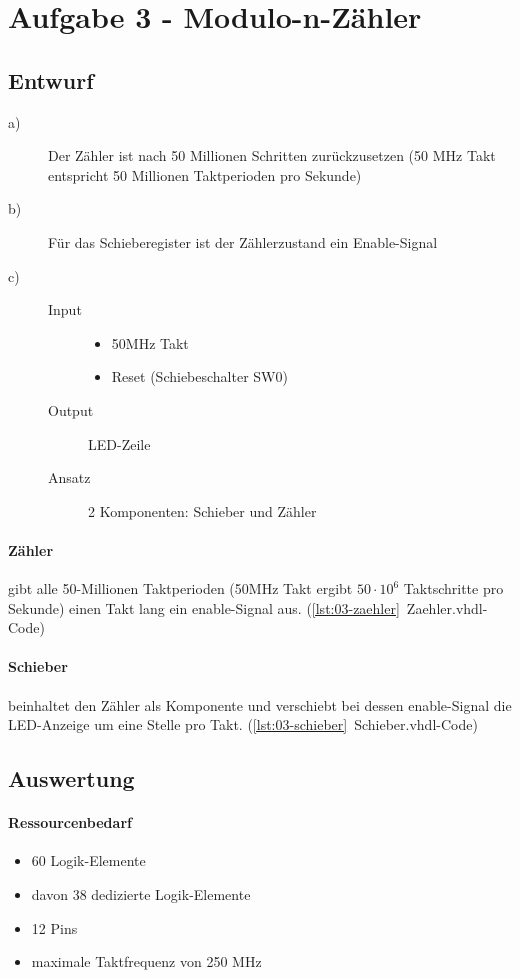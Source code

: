 \section{Aufgabe 3 - Modulo-n-Zähler}
\subsection{Entwurf}
\begin{description}
\item[a)] Der Zähler ist nach 50 Millionen Schritten zurückzusetzen (50 MHz Takt entspricht 50 Millionen Taktperioden pro Sekunde)
\item[b)] Für das Schieberegister ist der Zählerzustand ein Enable-Signal
\item[c)] \hfill 
	\begin{description}
	\item[Input] \hfill 
		\begin{itemize}
			\item 50MHz Takt
			\item Reset (Schiebeschalter SW0)
		\end{itemize}
	\item[Output] LED-Zeile
	\item[Ansatz] 2 Komponenten: Schieber und Zähler 
	\end{description}	
\end{description}
\paragraph{Zähler} gibt alle 50-Millionen Taktperioden (50MHz Takt ergibt $50\cdot10^6$ Taktschritte pro Sekunde) einen Takt lang ein enable-Signal aus. 
(\ref{lst:03-zaehler}~Zaehler.vhdl-Code)
\paragraph{Schieber} beinhaltet den Zähler als Komponente und verschiebt bei dessen enable-Signal die LED-Anzeige um eine Stelle pro Takt. (\ref{lst:03-schieber}~Schieber.vhdl-Code)

\subsection{Auswertung}
\paragraph{Ressourcenbedarf}
\begin{itemize} 
\item 60 Logik-Elemente
\item davon 38 dedizierte Logik-Elemente
\item 12 Pins 
\item maximale Taktfrequenz von 250 MHz
\end{itemize}
